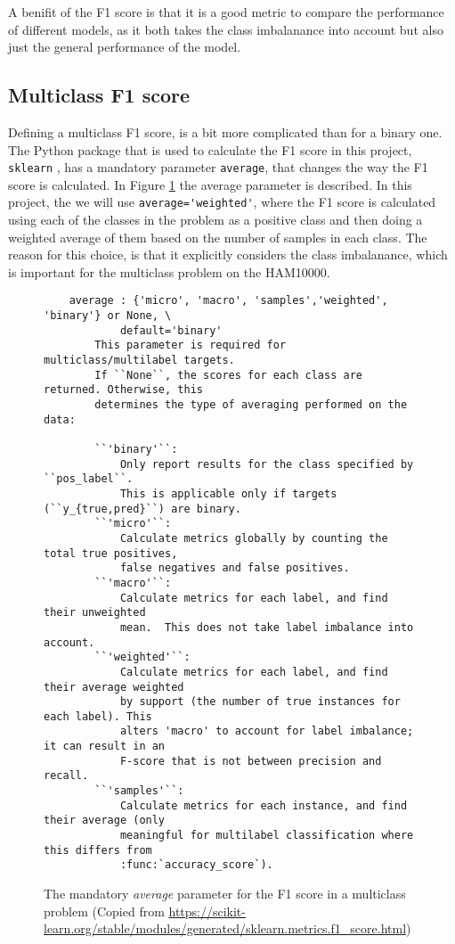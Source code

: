 A benifit of the F1 score is that it is a good metric to compare the performance of different models, 
as it both takes the class imbalanance into account but also just the general performance of the model.

\subsection{Multiclass F1 score}
Defining a multiclass F1 score, is a bit more complicated than for a binary one.
The Python package that is used to calculate the F1 score in this project, \verb|sklearn|
\cite{sklearn}, has a mandatory parameter \verb|average|, that changes the way the F1 score is calculated.
In Figure \ref{fig:sklearn-f1-average-docs} the average parameter is described.
In this project, the we will use \verb|average='weighted'|, where the F1 score is calculated
using each of the classes in the problem as a positive class and then doing a weighted average of them based
on the number of samples in each class.
The reason for this choice, is that it explicitly considers the class imbalanance,
which is important for the multiclass problem on the HAM10000.


\begin{figure}
\begin{verbatim}
    average : {'micro', 'macro', 'samples','weighted', 'binary'} or None, \
            default='binary'
        This parameter is required for multiclass/multilabel targets.
        If ``None``, the scores for each class are returned. Otherwise, this
        determines the type of averaging performed on the data:

        ``'binary'``:
            Only report results for the class specified by ``pos_label``.
            This is applicable only if targets (``y_{true,pred}``) are binary.
        ``'micro'``:
            Calculate metrics globally by counting the total true positives,
            false negatives and false positives.
        ``'macro'``:
            Calculate metrics for each label, and find their unweighted
            mean.  This does not take label imbalance into account.
        ``'weighted'``:
            Calculate metrics for each label, and find their average weighted
            by support (the number of true instances for each label). This
            alters 'macro' to account for label imbalance; it can result in an
            F-score that is not between precision and recall.
        ``'samples'``:
            Calculate metrics for each instance, and find their average (only
            meaningful for multilabel classification where this differs from
            :func:`accuracy_score`).
\end{verbatim}
\caption{The mandatory \textit{average} parameter for the F1 score in a multiclass problem (Copied from \url{https://scikit-learn.org/stable/modules/generated/sklearn.metrics.f1_score.html})}
\label{fig:sklearn-f1-average-docs}
\end{figure}







